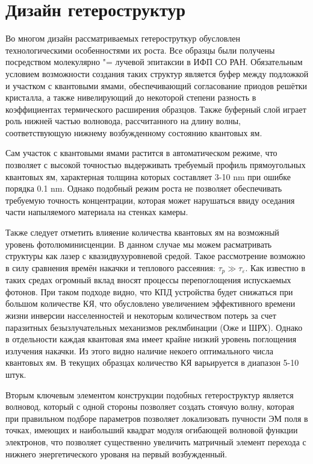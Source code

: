 \documentclass[../main.tex]{subfiles}
\begin{document}
        \chapter{Дизайн гетероструктур}

    Во многом дизайн рассматриваемых гетероструткур обусловлен технологическими особенностями их роста.
    Все образцы были получены посредством молекулярно "= лучевой эпитаксии в ИФП СО РАН.
    Обязательным условием возможности создания таких структур является буфер между подложкой 
    и участком с квантовыми ямами, обеспечивающий согласование приодов решётки кристалла, а также нивелирующий
    до некоторой степени разность в коэффициентах термического расширения образцов. Также буферный слой играет 
    роль нижней частью волновода, рассчитанного на длину волны, соответствующую нижнему возбужденному состоянию квантовых ям.

    Сам участок с квантовыми ямами растится в автоматическом режиме, что позволяет с высокой точностью выдерживать
    требуемый профиль прямоугольных квантовых ям, характерная толщина которых составляет 3-10 nm при ошибке порядка 0.1 nm.
    Однако подобный режим роста не позволяет обеспечивать требуемую точность концентрации, которая может нарушаться ввиду оседания
    части напыляемого материала на стенках камеры.

    Также следует отметить влияение количества квантовых ям на возможный уровень фотолюминисценции. В данном случае мы можем расматривать
    структуры как лазер с квазидвухуровневой средой. Такое рассмотрение возможно в силу сравнения времён накачки и теплового рассеяния:
    $\tau_p \gg \tau_\varepsilon$. Как известно в таких средах огромный вклад вносят процессы перепоглощения испускаемых фотонов. При таком
    подходе видно, что КПД устройства будет снижаться при большом количестве КЯ, что обусловлено увеличением эффективного времени жизни инверсии
    насселенностей и некоторым количеством потерь за счет паразитных безызлучательных механизмов реклмбинации (Оже и ШРХ). Однако в отдельности
    каждая квантовая яма имеет крайне низкий уровень поглощения излучения накачки. Из этого видно наличие некоего
    оптимального числа квантовых ям. В текущих образцах количество КЯ варьируется в диапазон 5-10 штук.

    Вторым ключевым элементом конструкции подобных гетероструктур является волновод, который с одной стороны позволяет создать стоячую волну, которая
    при правильном подборе параметров позволяет локализовать пучности ЭМ поля в точках, имеющих и наибольший квадрат модуля огибающей волновой функции электронов, 
    что позволяет существенно увеличить матричный элемент перехода с нижнего энергетического урованя на первый возбужденный.
\end{document}

